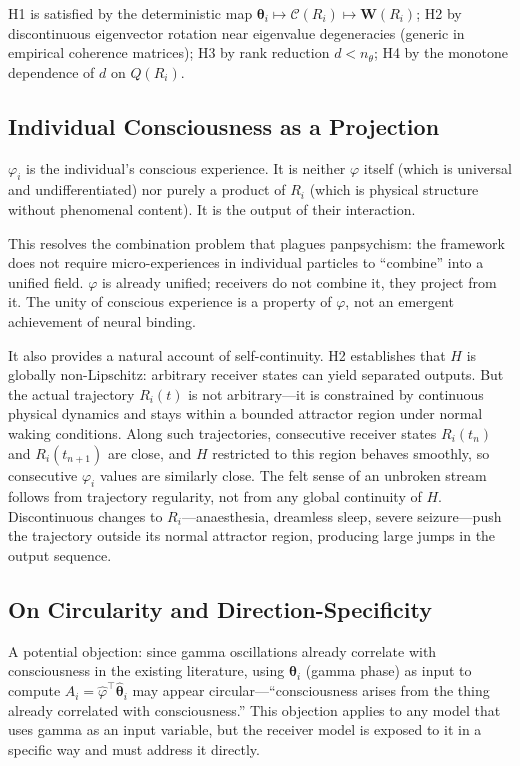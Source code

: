 \documentclass[12pt]{article}
\begin{document}
H1 is satisfied by the deterministic map $\boldsymbol{\theta}_i \mapsto \mathcal{C}(R_i) \mapsto \mathbf{W}(R_i)$; H2 by discontinuous eigenvector rotation near eigenvalue degeneracies (generic in empirical coherence matrices); H3 by rank reduction $d < n_\theta$; H4 by the monotone dependence of $d$ on $Q(R_i)$.

\subsection{Individual Consciousness as a Projection}

$\varphi_i$ is the individual's conscious experience. It is neither $\varphi$ itself (which is universal and undifferentiated) nor purely a product of $R_i$ (which is physical structure without phenomenal content). It is the output of their interaction.

This resolves the combination problem that plagues panpsychism: the framework does not require micro-experiences in individual particles to ``combine'' into a unified field. $\varphi$ is already unified; receivers do not combine it, they project from it. The unity of conscious experience is a property of $\varphi$, not an emergent achievement of neural binding.

It also provides a natural account of self-continuity. H2 establishes that $H$ is globally non-Lipschitz: arbitrary receiver states can yield separated outputs. But the actual trajectory $R_i(t)$ is not arbitrary---it is constrained by continuous physical dynamics and stays within a bounded attractor region under normal waking conditions. Along such trajectories, consecutive receiver states $R_i(t_n)$ and $R_i(t_{n+1})$ are close, and $H$ restricted to this region behaves smoothly, so consecutive $\varphi_i$ values are similarly close. The felt sense of an unbroken stream follows from trajectory regularity, not from any global continuity of $H$. Discontinuous changes to $R_i$---anaesthesia, dreamless sleep, severe seizure---push the trajectory outside its normal attractor region, producing large jumps in the output sequence.

\subsection{On Circularity and Direction-Specificity}

A potential objection: since gamma oscillations already correlate with consciousness in the existing literature, using $\boldsymbol{\theta}_i$ (gamma phase) as input to compute $A_i = \hat{\varphi}^\top\hat{\boldsymbol{\theta}}_i$ may appear circular---``consciousness arises from the thing already correlated with consciousness.'' This objection applies to any model that uses gamma as an input variable, but the receiver model is exposed to it in a specific way and must address it directly.
\end{document}
